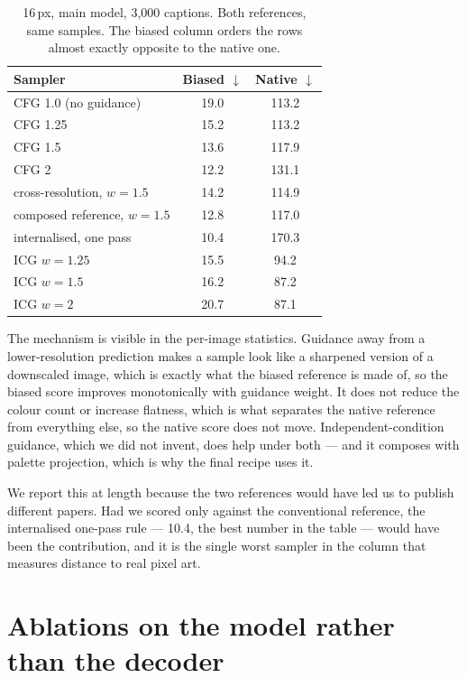 \documentclass[10pt,twocolumn,letterpaper]{article}
\begin{document}
\begin{table}[h]
\caption{16\,px, main model, 3{,}000 captions. Both references, same samples. The biased column orders the rows almost
exactly opposite to the native one.}
\label{tab:supcross}
\centering
\small
\begin{tabular}{@{}lcc@{}}
\toprule
Sampler & Biased $\downarrow$ & Native $\downarrow$ \\
\midrule
CFG 1.0 (no guidance)          & 19.0 & 113.2 \\
CFG 1.25                       & 15.2 & 113.2 \\
CFG 1.5                        & 13.6 & 117.9 \\
CFG 2                          & 12.2 & 131.1 \\
\midrule
cross-resolution, $w{=}1.5$    & 14.2 & 114.9 \\
composed reference, $w{=}1.5$  & 12.8 & 117.0 \\
internalised, one pass         & 10.4 & 170.3 \\
\midrule
ICG $w{=}1.25$                 & 15.5 & 94.2 \\
ICG $w{=}1.5$                  & 16.2 & 87.2 \\
ICG $w{=}2$                    & 20.7 & 87.1 \\
\bottomrule
\end{tabular}
\end{table}

The mechanism is visible in the per-image statistics. Guidance away from a lower-resolution prediction makes a sample
look like a sharpened version of a downscaled image, which is exactly what the biased reference is made of, so the
biased score improves monotonically with guidance weight. It does not reduce the colour count or increase flatness,
which is what separates the native reference from everything else, so the native score does not move. Independent-condition
guidance, which we did not invent, does help under both --- and it composes with palette projection, which is why the
final recipe uses it.

We report this at length because the two references would have led us to publish different papers. Had we scored only
against the conventional reference, the internalised one-pass rule --- 10.4, the best number in the table --- would
have been the contribution, and it is the single worst sampler in the column that measures distance to real pixel art.

\section{Ablations on the model rather than the decoder}
\label{sup:model-abl}
\end{document}
